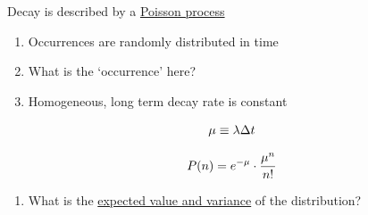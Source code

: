 \documentclass[aspectratio=1610,pdftex,dvipsnames,compress,xcolor={dvipsnames}]{beamer}
\begin{document}
\begin{frame}{Decay is described by a \href{https://stattrek.com/probability-distributions/poisson.aspx}{Poisson process}}
    \begin{enumerate}[series=outerlist,topsep=0pt,itemsep=21pt,leftmargin=*,label=(\arabic*)]
        \item[]Occurrences are randomly distributed in time
        \item[]What is the `occurrence' here?
        \item[]Homogeneous, long term decay rate is constant
    \end{enumerate}

    \vspace*{\fill}

    \begin{equation}
        \LARGE
        \mu \equiv \lambda \Delta t
    \end{equation}

    \begin{equation}
        \LARGE
        P(n) = e^{-\mu} \cdot \frac{\mu^n}{n!}
    \end{equation}

    \vspace*{\fill}

    \begin{enumerate}[series=outerlist,topsep=0pt,itemsep=21pt,leftmargin=*,label=(\arabic*)]
        \item[]What is the \href{https://uidaho.pressbooks.pub/riskassessment/chapter/statistical-moments/}{expected value and variance} of the distribution?
    \end{enumerate}
\end{frame}
\end{document}

